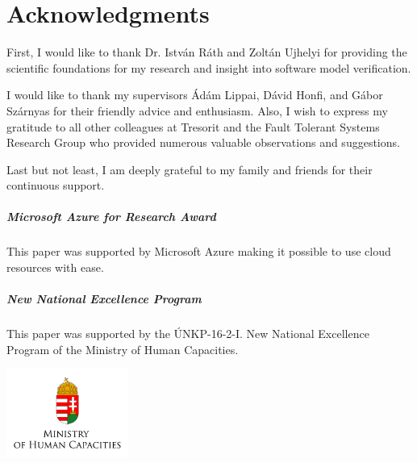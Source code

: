 \chapter*{Acknowledgments}
\label{chap:acknowledgments}
\thispagestyle{plain}

First, I would like to thank Dr. István Ráth and Zoltán Ujhelyi for providing the scientific foundations for my research and insight into software model verification.

I would like to thank my supervisors Ádám Lippai, Dávid Honfi, and Gábor Szárnyas for their friendly advice and enthusiasm. Also, I wish to express my gratitude to all other colleagues at Tresorit and the Fault Tolerant Systems Research Group who provided numerous valuable observations and suggestions.

Last but not least, I am deeply grateful to my family and friends for their continuous support.


\vfill

\paragraph{Microsoft Azure for Research Award}
This paper was supported by Microsoft Azure making it possible to use cloud resources with ease.

\paragraph{New National Excellence Program}
This paper was supported by the ÚNKP-16-2-I. New National Excellence Program of the Ministry of Human Capacities.

\begin{center}
\includegraphics[width=0.3\textwidth]{include/figures/min_en.jpg}
\end{center}
